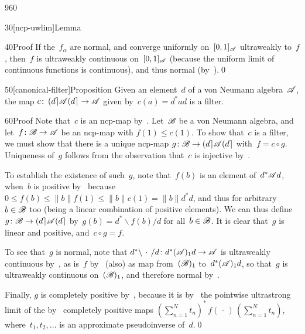 \begin{parsec}{960}
\begin{point}{30}[ncp-uwlim]{Lemma}
\begin{point}{40}{Proof}
If the~$f_\alpha$ 
are normal,
and converge uniformly on~$[0,1]_{\mathscr{A}}$ ultraweakly
to~$f$,
then~$f$ is ultraweakly continuous
on~$[0,1]_{\mathscr{A}}$
(because the uniform limit of continuous functions is continuous),
and thus normal (by~).\qed
\end{point}
\end{point}
\begin{point}{50}[canonical-filter]{Proposition}%
Given an element~$d$ of a von Neumann algebra~$\mathscr{A}$,
the map $c\colon \left(d\right\rceil\!\mathscr{A}\!\left(d\right\rceil\to\mathscr{A}$
given by~$c(a)=d^*ad$
is a filter.
\begin{point}{60}{Proof}%
Note that~$c$ is an ncp-map by~.
Let~$\mathscr{B}$ be a von Neumann algebra,
and let~$f\colon \mathscr{B}\to\mathscr{A}$ be an ncp-map
with $f(1)\leq c(1)$.
To show that~$c$ is a filter,
we must show that there is a unique ncp-map
$g\colon \mathscr{B}\to
\left(d\right\rceil\!\mathscr{A}\!\left(d\right\rceil$
with~$f=c\circ g$.
Uniqueness of~$g$ follows from the observation
that~$c$ is injective by~.

To establish the existence of such~$g$,
note that~$f(b)$ is an element of~$d^*\mathscr{A} d$,
when~$b$ is positive
by~
because~$0\leq f(b)\leq \|b\|f(1)\leq \|b\| c(1)=\|b\|d^*d$,
and thus for arbitrary~$b\in\mathscr{B}$ too
(being a linear combination
of positive elements).
We can thus define $g\colon \mathscr{B}\to \left(d\right\rceil\!\mathscr{A}\!\left(d\right\rceil$
by~$g(b)=d^*\backslash f(b)/d$
for all~$b\in\mathscr{B}$.
It is clear that~$g$ is linear and positive,
and~$c\circ g=f$.

To see that~$g$ is normal,
note that
$d^*\backslash\,\cdot\,/d\colon
d^*(\mathscr{A})_1 d\to\mathscr{A}$
is ultraweakly continuous by~,
as is~$f$ by~
(also) as map from~$(\mathscr{B})_1$ to~$d^*(\mathscr{A})_1 d$,
so that~$g$ is ultraweakly continuous on~$(\mathscr{B})_1$,
and therefore normal by~.

Finally, $g$ is completely positive
by~,
because it is by~
the pointwise ultrastrong limit
of the by~ completely positive maps
$(\sum_{n=1}^Nt_n)^* \,f(\,\cdot\,)\,(\sum_{n=1}^N t_n)$,
where~$t_1,t_2,\dotsc$
is an approximate pseudoinverse of~$d$.\qed
\end{point}
\end{point}
\end{parsec}
